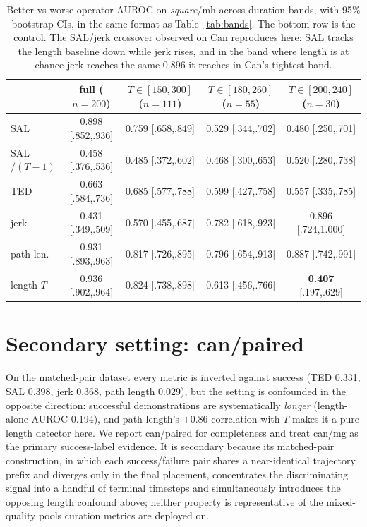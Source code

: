 \documentclass[10pt]{article}
\begin{document}
\begin{table}[h]
\centering
\small
\begin{tabular}{lcccc}
\toprule
& full ($n{=}200$) & $T \in [150,300]$ ($n{=}111$) & $T \in [180,260]$ ($n{=}55$) & $T \in [200,240]$ ($n{=}30$) \\
\midrule
SAL       & 0.898 [.852,.936] & 0.759 [.658,.849] & 0.529 [.344,.702] & 0.480 [.250,.701] \\
SAL$/(T{-}1)$ & 0.458 [.376,.536] & 0.485 [.372,.602] & 0.468 [.300,.653] & 0.520 [.280,.738] \\
TED       & 0.663 [.584,.736] & 0.685 [.577,.788] & 0.599 [.427,.758] & 0.557 [.335,.785] \\
jerk      & 0.431 [.349,.509] & 0.570 [.455,.687] & 0.782 [.618,.923] & 0.896 [.724,1.000] \\
path len. & 0.931 [.893,.963] & 0.817 [.726,.895] & 0.796 [.654,.913] & 0.887 [.742,.991] \\
\midrule
length $T$ & 0.936 [.902,.964] & 0.824 [.738,.898] & 0.613 [.456,.766] & \textbf{0.407} [.197,.629] \\
\bottomrule
\end{tabular}
\caption{Better-vs-worse operator AUROC on \emph{square}/mh across duration
bands, with 95\% bootstrap CIs, in the same format as
Table~\ref{tab:bands}. The bottom row is the control. The SAL/jerk
crossover observed on Can reproduces here: SAL tracks the length baseline
down while jerk rises, and in the band where length is at chance jerk
reaches the same 0.896 it reaches in Can's tightest band.}
\label{tab:square}
\end{table}

\section{Secondary setting: can/paired}
\label{app:paired}

On the matched-pair dataset every metric is inverted against success (TED
0.331, SAL 0.398, jerk 0.368, path length 0.029), but the setting is
confounded in the opposite direction: successful demonstrations are
systematically \emph{longer} (length-alone AUROC 0.194), and path length's
$+0.86$ correlation with $T$ makes it a pure length detector here. We
report can/paired for completeness and treat can/mg as the primary
success-label evidence. It is secondary because its matched-pair
construction, in which each success/failure pair shares a near-identical
trajectory prefix and diverges only in the final placement, concentrates
the discriminating signal into a handful of terminal timesteps and
simultaneously introduces the opposing length confound above; neither
property is representative of the mixed-quality pools curation metrics are
deployed on.
\end{document}
